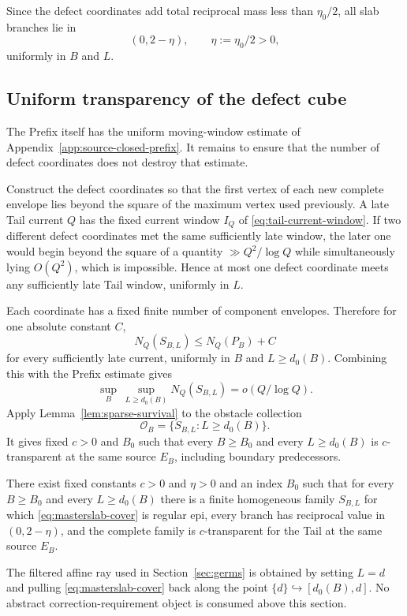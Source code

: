 Since the defect coordinates add total reciprocal mass less than $\eta_0/2$,
all slab branches lie in
\[
(0,2-\eta),
\qquad
\eta:=\eta_0/2>0,
\tag{A4}\label{eq:slab-margin}
\]
uniformly in $B$ and $L$.

\subsection{Uniform transparency of the defect cube}

The Prefix itself has the uniform moving-window estimate of
Appendix~\ref{app:source-closed-prefix}.  It remains to ensure that the number
of defect coordinates does not destroy that estimate.

Construct the defect coordinates so that the first vertex of each new complete
envelope lies beyond the square of the maximum vertex used previously.  A late
Tail current $Q$ has the fixed current window $I_Q$ of
\eqref{eq:tail-current-window}.  If two different defect coordinates met the
same sufficiently late window, the later one would begin beyond the square of
a quantity $\gg Q^2/\log Q$ while simultaneously lying $O(Q^2)$, which is
impossible.  Hence at most one defect coordinate meets any sufficiently late
Tail window, uniformly in $L$.

Each coordinate has a fixed finite number of component envelopes.  Therefore
for one absolute constant $C$,
\[
N_Q(S_{B,L})
\le N_Q(P_B)+C
\]
for every sufficiently late current, uniformly in $B$ and
$L\ge d_0(B)$.  Combining this with the Prefix estimate gives
\[
\sup_B\ \sup_{L\ge d_0(B)}N_Q(S_{B,L})
=o(Q/\log Q).
\tag{A5}\label{eq:slab-uniform-incidence}
\]
Apply Lemma~\ref{lem:sparse-survival} to the obstacle collection
\[
\mathcal O_B=\{S_{B,L}:L\ge d_0(B)\}.
\]
It gives fixed $c>0$ and $B_0$ such that every $B\ge B_0$ and every
$L\ge d_0(B)$ is $c$-transparent at the same source $E_B$, including boundary
predecessors.

\begin{theorem}\label{thm:masterslab}
There exist fixed constants $c>0$ and $\eta>0$ and an index $B_0$ such that
for every $B\ge B_0$ and every $L\ge d_0(B)$ there is a finite homogeneous
family $S_{B,L}$ for which \eqref{eq:masterslab-cover} is regular epi, every
branch has reciprocal value in $(0,2-\eta)$, and the complete family is
$c$-transparent for the Tail at the same source $E_B$.
\end{theorem}

The filtered affine ray used in Section~\ref{sec:germs} is obtained by setting
$L=d$ and pulling \eqref{eq:masterslab-cover} back along the point
$\{d\}\hookrightarrow[d_0(B),d]$.  No abstract correction-requirement object
is consumed above this section.
